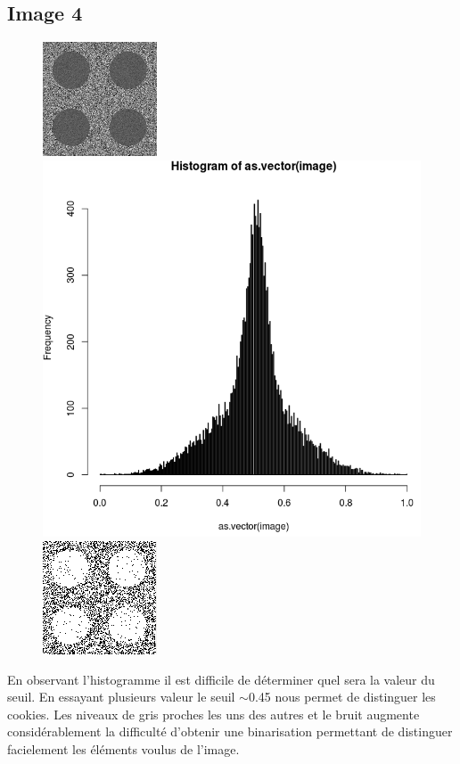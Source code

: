 \documentclass[a4paper,12pt]{report}
\begin{document}
\newpage 

\subsection*{Image 4}
\begin{figure}[!ht]
	\center
	\includegraphics[scale=0.5]{../rdf-2-classes-texture-3.png}
	\includegraphics[scale=0.3]{image/text4.png}
	\includegraphics[scale=0.5]{image/text41.png}
\end{figure}


En observant l'histogramme il est difficile de déterminer quel sera la valeur du seuil. En essayant plusieurs valeur le seuil $\sim$0.45 nous permet de distinguer les cookies. Les niveaux de gris proches les uns des autres et le bruit augmente considérablement la difficulté d'obtenir une binarisation permettant de distinguer facielement les éléments voulus de l'image.
\end{document}
